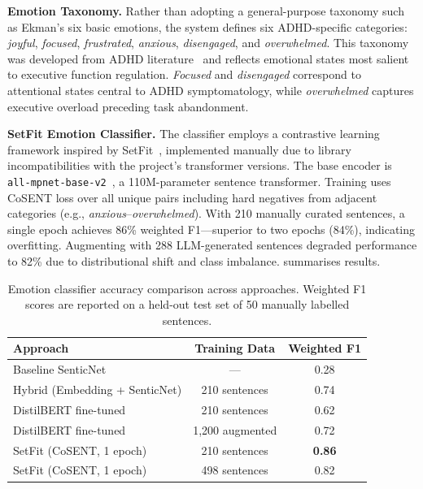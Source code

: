 \textbf{Emotion Taxonomy.} Rather than adopting a general-purpose taxonomy such as Ekman's six basic emotions, the system defines six ADHD-specific categories: \emph{joyful}, \emph{focused}, \emph{frustrated}, \emph{anxious}, \emph{disengaged}, and \emph{overwhelmed}. This taxonomy was developed from ADHD literature~\cite{barkley2010, diamond2013} and reflects emotional states most salient to executive function regulation. \emph{Focused} and \emph{disengaged} correspond to attentional states central to ADHD symptomatology, while \emph{overwhelmed} captures executive overload preceding task abandonment.

\textbf{SetFit Emotion Classifier.} The classifier employs a contrastive learning framework inspired by SetFit~\cite{reimers2019}, implemented manually due to library incompatibilities with the project's transformer versions. The base encoder is \texttt{all-mpnet-base-v2}~\cite{wang2020}, a 110M-parameter sentence transformer. Training uses CoSENT loss over all unique pairs including hard negatives from adjacent categories (e.g., \emph{anxious}--\emph{overwhelmed}). With 210 manually curated sentences, a single epoch achieves 86\% weighted F1---superior to two epochs (84\%), indicating overfitting. Augmenting with 288 LLM-generated sentences degraded performance to 82\% due to distributional shift and class imbalance.  summarises results.

\begin{table}[htbp]
  \centering
  \caption{Emotion classifier accuracy comparison across approaches. Weighted F1 scores are reported on a held-out test set of 50 manually labelled sentences.}
  \label{tab:emotion_classifiers}
  \begin{tabular}{lcc}
    \toprule
    \textbf{Approach} & \textbf{Training Data} & \textbf{Weighted F1} \\
    \midrule
    Baseline SenticNet             & ---              & 0.28 \\
    Hybrid (Embedding + SenticNet) & 210 sentences    & 0.74 \\
    DistilBERT fine-tuned          & 210 sentences    & 0.62 \\
    DistilBERT fine-tuned          & 1,200 augmented  & 0.72 \\
    SetFit (CoSENT, 1 epoch)       & 210 sentences    & \textbf{0.86} \\
    SetFit (CoSENT, 1 epoch)       & 498 sentences    & 0.82 \\
    \bottomrule
  \end{tabular}
\end{table}

